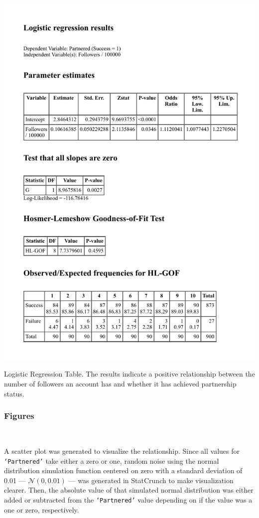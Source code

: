 \documentclass[12pt]{article}
\begin{document}
\begin{table}[H]
  \centering %
  \includegraphics[scale=1]{../StatCrunch_Results/logit_partnered_followers/table}
  \captionsetup{justification=centering, singlelinecheck=false, margin=2cm}
  \caption[Logistic Regression: Predict Partnered Status by Number of Followers]{Logistic Regression Table. The results indicate a positive relationship between the number of followers an account has and whether it has achieved partnership status.}
  \label{tab:logistic_table}
\end{table}

\subsubsection{Figures}\

A scatter plot was generated to visualize the relationship. Since all values for \texttt{`Partnered'} take either a zero or one, random noise using the normal distribution simulation function centered on zero with a standard deviation of 0.01 --- $\mathcal{N}(0, 0.01)$ --- was generated in StatCrunch to make visualization clearer. Then, the absolute value of that simulated normal distribution was either added or subtracted from the \texttt{`Partnered'} value depending on if the value was a one or zero, respectively. 
\end{document}
